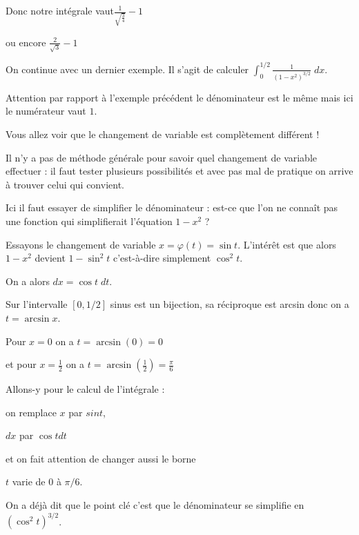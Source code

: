 Donc notre intégrale vaut$\frac1{\sqrt{\frac34}}-1$

\change

ou encore $\frac{2}{\sqrt3}-1$



\diapo


On continue avec un dernier exemple.
Il s'agit de calculer $\int_0^{1/2}\frac{1}{(1-x^2)^{3/2}} \;dx$.


Attention par rapport à l'exemple précédent le dénominateur est le même mais ici le numérateur vaut $1$.

Vous allez voir que le changement de variable est complètement différent !

Il n'y a pas de méthode générale pour savoir quel changement 
de variable effectuer : il faut tester plusieurs possibilités et avec pas mal de pratique
on arrive à trouver celui qui convient.


Ici il faut essayer de simplifier le dénominateur : est-ce que l'on ne connaît pas une fonction
qui simplifierait l'équation $1-x^2$ ?

\change

Essayons le changement de variable $x=\varphi(t) = \sin t$.
L'intérêt est que alors $1-x^2$ devient $1-\sin^2 t$ c'est-à-dire simplement $\cos^2 t$.

\change

On a alors $dx = \cos t \; dt$.

\change

Sur l'intervalle $[0,1/2]$ sinus est un bijection, sa réciproque est arcsin donc
on a $t=\arcsin x$.  

Pour $x=0$ on a $t=\arcsin(0)=0$


\change

et pour $x=\frac12$ on a $t=\arcsin(\frac12)=\frac\pi6$



\change


Allons-y pour le calcul de l'intégrale :

\change

on remplace $x$ par $sin t$,

$dx$ par $\cos t dt$

et on fait attention de changer aussi le borne 

$t$ varie de $0$ à $\pi/6$.

\change

On a déjà dit que le point clé c'est que le dénominateur se simplifie 
en $(\cos^2 t)^{3/2}$.

